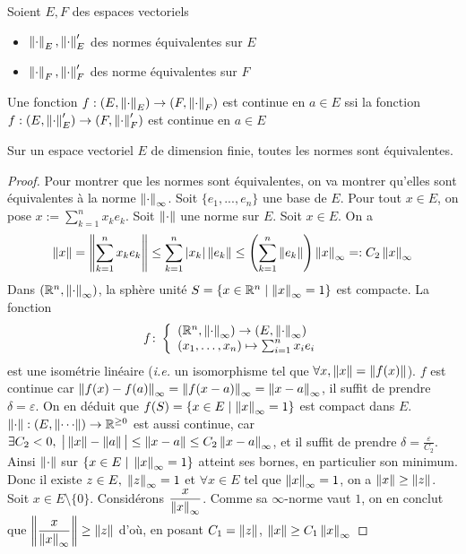 \begin{proposition}[Exo]
    Soient $E,F$ des espaces vectoriels
    \begin{itemize}
        \item $\left\| \cdot \right\|_E,\left\| \cdot \right\|'_E$ des normes équivalentes sur $E$
        \item $\left\| \cdot \right\|_F,\left\| \cdot \right\|'_F$ des norme équivalentes sur $F$
    \end{itemize}
    Une fonction $f:(E,\left\| \cdot \right\|_E)\to (F,\left\| \cdot \right\|_F) $ est continue en $a\in E$ ssi la fonction  $f:(E,\left\| \cdot \right\|'_E)\to (F,\left\| \cdot \right\|'_F) $ est continue en $a\in E$
\end{proposition}
\begin{theoreme}
    Sur un espace vectoriel $E$ de dimension finie, toutes les normes sont équivalentes.
\end{theoreme}
\begin{proof}
Pour montrer que les normes sont équivalentes, on va montrer qu'elles sont équivalentes à la norme $\left\| \cdot \right\|_\infty$. 
Soit $\{e_1,...,e_n\}$ une base de $E$. Pour tout $x\in 
E$, on pose  $x:=\sum_{k=1}^nx_ke_k$. Soit $\left\| \cdot \right\|$ une norme sur $E$. Soit $x\in E$. On a
    \[
    \left\| x \right\|=\left\| \sum_{k=1}^nx_ke_k \right\|\leq \sum_{k=1}^n|x_k|\left\| e_k \right\|\leq\left(\sum_{k=1}^n\left\| e_k \right\|\right)\left\| x \right\|_{\infty}=:C_2\left\| x \right\|_\infty
    \]
    Dans $(\mathbb{R}^n,\left\| \cdot \right\|_\infty)$, la sphère unité $S=\{x\in \mathbb{R}^n\mid\left\| x \right\|_\infty=1\}$ est compacte. La fonction $$f\colon \left\{\begin{array}{l}(\mathbb{R}^n,\left\| \cdot \right\|_\infty)\to (E,\left\| \cdot \right\|_\infty) \\ (x_1, \dots, x_n) \mapsto \sum_{i = 1}^nx_ie_i\end{array}\right.$$ est une isométrie linéaire (\textit{i.e.} un isomorphisme tel que $\forall x,\left\| x \right\| = \left\| f(x) \right\|$). $f$ est continue car $\left\| f(x)-f(a) \right\|_\infty = \left\| f(x-a) \right\|_\infty = \left\| x-a \right\|_{\infty}$, il suffit de prendre $\delta = \varepsilon$.
    On en déduit que $f(S) = \{ x\in E \mid \left\| x \right\|_\infty=  1\}$ est compact dans $E$. $\norm{\cdot} : (E,\norm{\cdots})\to \R^{\geq 0}$ est aussi continue, car $\exists C_2<0,\; \big|\left\| x \right\|-\left\| a \right\| \big|\leq\left\| x-a \right\|\leq C_2\left\| x-a \right\|_\infty$, et il suffit de prendre $\delta = \frac{\varepsilon}{C_2}$. Ainsi $\left\| \cdot \right\|$ sur $\{ x\in E \;|\; \left\| x \right\|_\infty=  1\}$ atteint ses bornes, en particulier son minimum.
    Donc il existe $z\in E,\; \left\| z \right\| _\infty = 1$ et $\forall x  \in E$ tel que $\left\| x \right\|_\infty = 1$, on a $\left\| x \right\| \geq \left\| z \right\| $. Soit $x\in E\setminus \{0\}$. Considérons $\dfrac{x}{\left\| x \right\| _\infty}$. Comme sa $\infty$-norme vaut $1$, on en conclut que $\left\| \dfrac{x}{\left\| x \right\| _\infty} \right\|\geq \left\| z \right\| $ d'où, en posant $C_1 = \left\| z \right\|$, $\left\| x \right\| \geq C_1\left\| x \right\| _\infty$
\end{proof}
